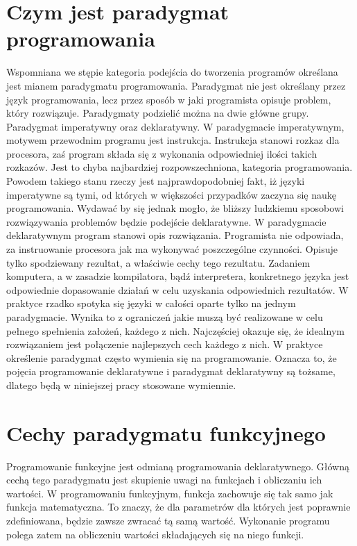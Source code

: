 \documentclass[a4paper,10pt]{report}
\begin{document}
\section{Czym jest paradygmat programowania}
Wspomniana we stępie kategoria podejścia do tworzenia programów określana jest mianem paradygmatu programowania. Paradygmat nie jest określany przez język programowania, lecz przez sposób w jaki programista opisuje problem, który rozwiązuje. Paradygmaty podzielić można na dwie główne grupy. Paradygmat imperatywny oraz deklaratywny. W paradygmacie imperatywnym, motywem przewodnim programu jest instrukcja. Instrukcja stanowi rozkaz dla procesora, zaś program składa się z wykonania odpowiedniej ilości takich rozkazów. Jest to chyba najbardziej rozpowszechniona, kategoria programowania. Powodem takiego stanu rzeczy jest najprawdopodobniej fakt, iż języki imperatywne są tymi, od których w większości przypadków zaczyna się naukę programowania. Wydawać by się jednak mogło, że bliższy ludzkiemu sposobowi rozwiązywania problemów będzie podejście deklaratywne. W paradygmacie deklaratywnym program stanowi opis rozwiązania. Programista nie odpowiada, za instruowanie procesora jak ma wykonywać poszczególne czynności. Opisuje tylko spodziewany rezultat, a właściwie cechy tego rezultatu. Zadaniem komputera, a w zasadzie kompilatora, bądź interpretera, konkretnego języka jest odpowiednie dopasowanie działań w celu uzyskania odpowiednich rezultatów. W praktyce rzadko spotyka się języki w całości oparte tylko na jednym paradygmacie. Wynika to z ograniczeń jakie muszą być realizowane w celu pełnego spełnienia założeń, każdego z nich. Najczęściej okazuje się, że idealnym rozwiązaniem jest połączenie najlepszych cech każdego z nich. W praktyce określenie paradygmat często wymienia się na programowanie. Oznacza to, że pojęcia programowanie deklaratywne i paradygmat deklaratywny są tożsame, dlatego będą w niniejszej pracy stosowane wymiennie.
\section{Cechy paradygmatu funkcyjnego}
Programowanie funkcyjne jest odmianą programowania deklaratywnego. Główną cechą tego paradygmatu jest skupienie uwagi na funkcjach i obliczaniu ich wartości. W programowaniu funkcyjnym, funkcja zachowuje się tak samo jak funkcja matematyczna. To znaczy, że dla parametrów dla których jest poprawnie zdefiniowana, będzie zawsze zwracać tą samą wartość. Wykonanie programu polega zatem na obliczeniu wartości składających się na niego funkcji.
\end{document}
